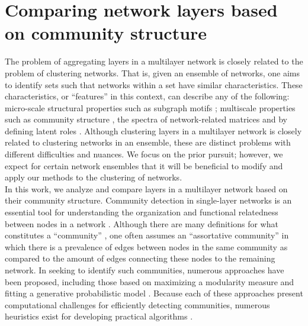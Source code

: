 \section{Comparing network layers based on community structure}
\indent The problem of aggregating layers in a multilayer network is closely related to the problem of clustering networks. That is, given an ensemble of networks, one aims to identify sets such that networks within a set have similar characteristics. 
These characteristics, or ``features'' in this context, can describe any of the following: micro-scale structural properties such as subgraph motifs \cite{ugander2013subgraph,motiffinding}; multiscale properties such as community structure \cite{taxonomy,NONCluster,confusingMesoscopic}, the spectra of network-related matrices \cite{structurenetwork} and by defining latent roles \cite{netensemble}. Although clustering layers in a multilayer network is closely related to clustering networks in an ensemble, these are distinct problems with different difficulties and nuances. We focus on the prior pursuit; however, we expect for certain network ensembles that it will be beneficial to modify and apply our methods to the clustering of networks. 
\\
\indent 
In this work, we analyze and compare layers in a multilayer network based on their community structure. Community detection in single-layer networks is an essential tool for understanding the organization and functional relatedness between nodes in a network \cite{porter2009communities,fortunato}.
Although there are many definitions for what constitutes a ``community'' \cite{rombach2014core}, one often assumes an ``assortative community'' in which there is a prevalence of edges between nodes in the same community as compared to the amount of edges connecting these nodes to the remaining network. In seeking to identify such communities, numerous approaches have been proposed, including those based on
maximizing a modularity measure \cite{newmanmodularity} and fitting a generative probabilistic model \cite{abby}. Because each of these approaches present computational challenges for efficiently detecting communities, numerous heuristics exist for developing practical algorithms \cite{community,fortunato,leskoveccommunity,clausethierarchy,newmanspectral}. \\
